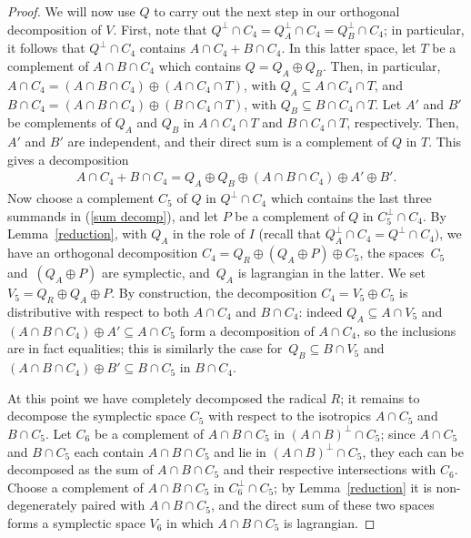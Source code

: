 \documentclass[pdftex]{sigma}
\numberwithin{equation}{section}
\begin{document}
\begin{proof}
We will now use $Q$ to carry out the next step in our orthogonal decomposition of $V$.
First, note that $Q^{\perp} \cap C_4 = Q_A^{\perp} \cap C_4 = Q_B^{\perp} \cap C_4$; in particular, it follows that $Q^{\perp} \cap C_4$ contains $A \cap C_4 + B \cap C_4$. In this latter space, let $T$ be a complement of $A \cap B \cap C_4$ which contains $Q = Q_A \oplus Q_B$. Then, in particular, $A \cap C_4 = (A \cap B \cap C_4) \oplus (A \cap C_4 \cap T)$, with $Q_A \subseteq A \cap C_4 \cap T$, and $B \cap C_4 = (A \cap B \cap C_4) \oplus (B \cap C_4 \cap T)$, with $Q_B \subseteq B \cap C_4 \cap T$. Let $A'$ and $B'$ be complements of $Q_A$ and $Q_B$ in $A \cap C_4 \cap T$ and $B \cap C_4 \cap T$, respectively. Then, $A'$ and $B'$ are independent, and their direct sum is a complement of $Q$ in $T$. This gives a decomposition
\begin{gather}\label{sum decomp}
A \cap C_4 + B \cap C_4 = Q_A \oplus Q_B \oplus (A \cap B \cap C_4) \oplus A' \oplus B'.
\end{gather}
Now choose a complement $C_5$ of $Q$ in $Q^{\perp} \cap C_4$ which contains the last three summands in (\ref{sum decomp}), and let $P$ be a complement of $Q$ in $C_5^{\perp} \cap C_4$. By Lemma~\ref{reduction}, with $Q_A$ in the role of $I$ (recall that $Q_A^{\perp} \cap C_4 = Q^{\perp} \cap C_4)$, we have an orthogonal decomposition $C_4 = Q_R \oplus (Q_A \oplus P) \oplus C_5$, the spaces~$C_5$ and~$(Q_A \oplus P)$ are symplectic, and~$Q_A$ is lagrangian in the latter. We set $V_5 = Q_R \oplus Q_A \oplus P$. By construction, the decomposition $C_4 = V_5 \oplus C_5$ is distributive with respect to both $A \cap C_4$ and $B \cap C_4$: indeed $Q_A \subseteq A \cap V_5$ and $(A \cap B \cap C_4) \oplus A' \subseteq A \cap C_5$ form a decomposition of $A \cap C_4$, so the inclusions are in fact equalities; this is similarly the case for~$Q_B \subseteq B \cap V_5$ and $(A \cap B \cap C_4) \oplus B' \subseteq B \cap C_5$ in $B \cap C_4$.

At this point we have completely decomposed the radical $R$; it remains to decompose the symplectic space $C_5$ with respect to the isotropics $A \cap C_5$ and $B \cap C_5$. Let $C_6$ be a complement of $A \cap B \cap C_5$ in $(A \cap B)^{\perp} \cap C_5$; since $A \cap C_5$ and $B \cap C_5$ each contain $A \cap B \cap C_5$ and lie in $(A \cap B)^{\perp} \cap C_5$, they each can be decomposed as the sum of $A \cap B \cap C_5$ and their respective intersections with $C_6$.  Choose a complement of $A \cap B \cap C_5$ in $C_6^{\perp} \cap C_5$; by Lemma~\ref{reduction} it is non-degenerately paired with $A \cap B \cap C_5$, and the direct sum of these two spaces forms a symplectic space $V_6$ in which $A \cap B \cap C_5$ is lagrangian.


\end{proof}
\end{document}
